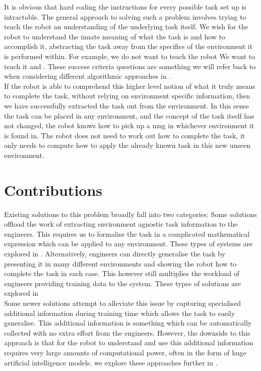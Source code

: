 It is obvious that hard coding the instructions for every possible task set up is intractable. The general approach to solving such a problem involves trying to teach the robot an understanding of the underlying task itself. We wish for the robot to understand the innate meaning of what the task is and how to accomplish it, abstracting the task away from the specifics of the environment it is performed within. For example, we do not want to teach the robot  We want to teach it  and . These success criteria questions are something we will refer back to when considering different algorithmic approaches in .\\

If the robot is able to comprehend this higher level notion of what it truly means to complete the task, without relying on environment specific information, then we have successfully extracted the task out from the environment. In this sense the task can be placed in any environment, and the concept of the task itself has not changed, the robot knows how to pick up a mug in whichever environment it is found in. The robot does not need to work out how to complete the task, it only needs to compute how to apply the already known task in this new unseen environment.

\section{Contributions}
Existing solutions to this problem broadly fall into two categories: Some solutions offload the work of extracting environment agnostic task information to the engineers. This requires us to formalise the task in a complicated mathematical expression which can be applied to any environment. These types of systems are explored in . Alternatively, engineers can directly generalise the task by presenting it in many different environments and showing the robot how to complete the task in each case. This however still multiplies the workload of engineers providing training data to the system. These types of solutions are explored in  \\
Some newer solutions attempt to alleviate this issue by capturing specialised additional information during training time which allows the task to easily generalise. This additional information is something which can be automatically collected with no extra effort from the engineers. However, the downside to this approach is that for the robot to understand and use this additional information requires very large amounts of computational power, often in the form of huge artificial intelligence models. we explore these approaches further in .\\

